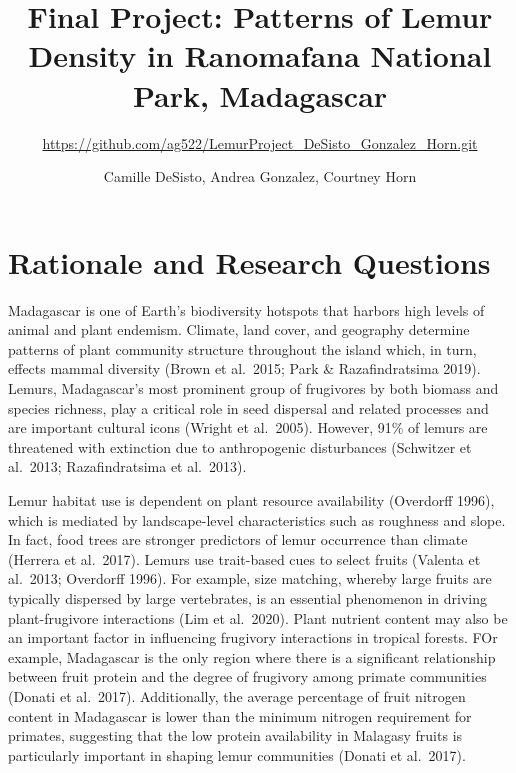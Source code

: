 \documentclass[
  12pt,
]{article}
\title{Final Project: Patterns of Lemur Density in Ranomafana National
Park, Madagascar}
\subtitle{\url{https://github.com/ag522/LemurProject_DeSisto_Gonzalez_Horn.git}}
\author{Camille DeSisto, Andrea Gonzalez, Courtney Horn}
\date{}
\begin{document}
\maketitle

\newpage
\tableofcontents 
\newpage
\listoftables 
\newpage
\listoffigures 
\newpage

\hypertarget{rationale-and-research-questions}{%
\section{Rationale and Research
Questions}\label{rationale-and-research-questions}}

Madagascar is one of Earth's biodiversity hotspots that harbors high
levels of animal and plant endemism. Climate, land cover, and geography
determine patterns of plant community structure throughout the island
which, in turn, effects mammal diversity (Brown et al.~2015; Park \&
Razafindratsima 2019). Lemurs, Madagascar's most prominent group of
frugivores by both biomass and species richness, play a critical role in
seed dispersal and related processes and are important cultural icons
(Wright et al.~2005). However, 91\% of lemurs are threatened with
extinction due to anthropogenic disturbances (Schwitzer et al.~2013;
Razafindratsima et al.~2013).

Lemur habitat use is dependent on plant resource availability (Overdorff
1996), which is mediated by landscape-level characteristics such as
roughness and slope. In fact, food trees are stronger predictors of
lemur occurrence than climate (Herrera et al.~2017). Lemurs use
trait-based cues to select fruits (Valenta et al.~2013; Overdorff 1996).
For example, size matching, whereby large fruits are typically dispersed
by large vertebrates, is an essential phenomenon in driving
plant-frugivore interactions (Lim et al.~2020). Plant nutrient content
may also be an important factor in influencing frugivory interactions in
tropical forests. FOr example, Madagascar is the only region where there
is a significant relationship between fruit protein and the degree of
frugivory among primate communities (Donati et al.~2017). Additionally,
the average percentage of fruit nitrogen content in Madagascar is lower
than the minimum nitrogen requirement for primates, suggesting that the
low protein availability in Malagasy fruits is particularly important in
shaping lemur communities (Donati et al.~2017).
\end{document}
